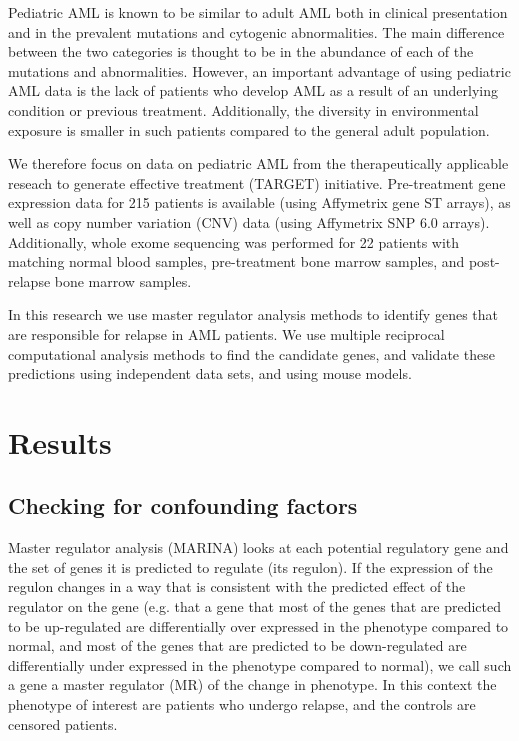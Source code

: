 \documentclass[10pt, letterpaper, twoside, english]{article}
\begin{document}
Pediatric AML is known to be similar to adult AML both in clinical presentation 
and in the prevalent mutations and cytogenic abnormalities.
The main difference between the two categories is thought to be in the abundance of each
of the mutations and abnormalities.
However, an important advantage of using pediatric AML data is the lack of patients who
develop AML as a result of an underlying condition or previous treatment.
Additionally, the diversity in environmental exposure is smaller in such patients
compared to the general adult population.

We therefore focus on data on pediatric AML from the
therapeutically applicable reseach to generate effective treatment (TARGET) initiative.
Pre-treatment gene expression data for 215 patients is available 
(using Affymetrix gene ST arrays),
as well as copy number variation (CNV) data (using Affymetrix SNP 6.0 arrays).
Additionally, whole exome sequencing was performed for 22 patients with matching 
normal blood samples, pre-treatment bone marrow samples, and post-relapse bone marrow samples.

In this research we use master regulator analysis methods to identify genes that
are responsible for relapse in AML patients. 
We use multiple reciprocal computational analysis methods to find the candidate genes, 
and validate these predictions using independent data sets,
and using mouse models.

\section{Results}
\subsection{Checking for confounding factors}
Master regulator analysis (MARINA) looks at each potential regulatory gene 
and the set of genes it is predicted to regulate (its regulon).
If the expression of the regulon changes in a way that is consistent with the predicted 
effect of the regulator on the gene
(e.g. that a gene that most of the genes that are predicted to be up-regulated are differentially
over expressed in the phenotype compared to normal, 
and most of the genes that are predicted to be down-regulated are differentially
under expressed in the phenotype compared to normal),
we call such a gene a master regulator (MR) of the change in phenotype.
In this context the phenotype of interest are patients who undergo relapse, 
and the controls are censored patients.
\end{document}
